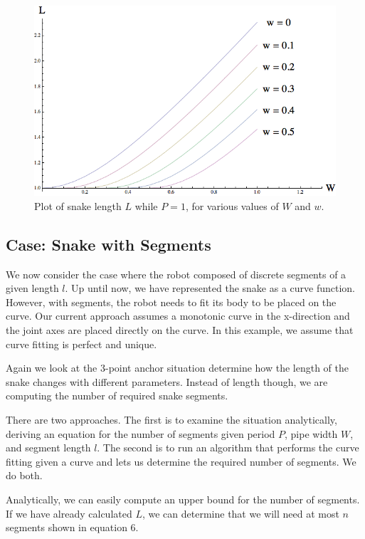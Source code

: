 \begin{figure}[htb]
\begin{center}
\includegraphics[scale=0.6]{2011_01_24_Plot_WidthAnchor}
\end{center}
\caption{Plot of snake length $L$ while $P=1$, for various values of $W$ and $w$.}
\label{plot_2}
\end{figure}

\subsection{Case: Snake with Segments}

We now consider the case where the robot composed of discrete segments of a given length $l$.  Up until now, we have represented the snake as a curve function.  However, with segments, the robot needs to fit its body to be placed on the curve.   Our current approach assumes a monotonic curve in the x-direction and the joint axes are placed directly on the curve.  In this example, we assume that curve fitting is perfect and unique.

Again we look at the 3-point anchor situation determine how the length of the snake changes with different parameters.  Instead of length though, we are computing the number of required snake segments.

There are two approaches.  The first is to examine the situation analytically, deriving an equation for the number of segments given period $P$, pipe width $W$, and segment length $l$.  The second is to run an algorithm that performs the curve fitting given a curve and lets us determine the required number of segments.  We do both.

Analytically, we can easily compute an upper bound for the number of segments.  If we have already calculated $L$, we can determine that we will need at most $n$ segments shown in equation 6.

